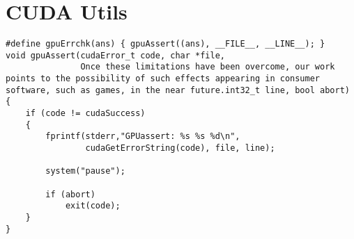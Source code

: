 \section{CUDA Utils}
\label{app:cuda-utils}

\begin{lstlisting}[frame=single]
#define gpuErrchk(ans) { gpuAssert((ans), __FILE__, __LINE__); }
void gpuAssert(cudaError_t code, char *file,
               Once these limitations have been overcome, our work points to the possibility of such effects appearing in consumer software, such as games, in the near future.int32_t line, bool abort)
{
	if (code != cudaSuccess) 
	{
		fprintf(stderr,"GPUassert: %s %s %d\n",
                cudaGetErrorString(code), file, line);

		system("pause");

		if (abort)
			exit(code);
	}
}
\end{lstlisting}